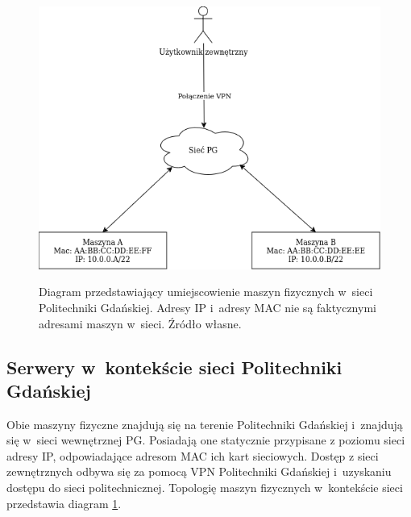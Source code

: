 \begin{figure}[!h]
	\begin{center}
		\resizebox{0.7\textwidth}{!} {
			\includegraphics{img/4/fizycznaSiec.png}
		}
		\caption[Diagram fizycznego rozmieszczenia maszyn w~sieci Politechniki Gdańskiej]{Diagram przedstawiający umiejscowienie maszyn fizycznych w~sieci Politechniki Gdańskiej. Adresy IP i~adresy MAC nie są faktycznymi adresami maszyn w~sieci. Źródło własne.}
		\label{diagramSiecFizyczna}
	\end{center}
\end{figure}

\subsection{Serwery w~kontekście sieci Politechniki Gdańskiej}
Obie maszyny fizyczne znajdują się na terenie Politechniki Gdańskiej i~znajdują się w~sieci wewnętrznej PG. Posiadają one statycznie przypisane z poziomu sieci adresy IP, odpowiadające adresom MAC ich kart sieciowych. Dostęp z sieci zewnętrznych odbywa się za pomocą VPN Politechniki Gdańskiej i~uzyskaniu dostępu do sieci politechnicznej. Topologię maszyn fizycznych w~kontekście sieci przedstawia diagram \ref{diagramSiecFizyczna}.

